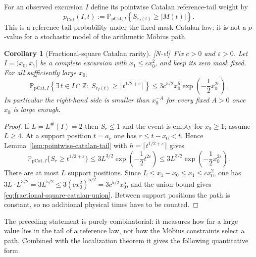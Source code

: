 \documentclass[11pt,reqno]{amsart}
\numberwithin{equation}{section}
\theoremstyle{plain}
\newtheorem{corollary}[theorem]{Corollary}
\theoremstyle{definition}
\theoremstyle{remark}
\newcommand{\eps}{\varepsilon}
\newcommand{\tagNE}{\textup{[N-el]}}
\begin{document}
For an observed excursion $I$ define its pointwise Catalan reference-tail weight
by
\begin{equation}
\label{eq:pointwise-catalan-pvalue}
 p_{\mathrm{Cat}}(I,t):=
 \mathbb P_{\mathrm{pCat},I}
 \left\{S_{r_I(t)}\ge |M(t)|\right\}.
\end{equation}
This is a reference-tail probability under the fixed-mask Catalan law; it is
not a $p$-value for a stochastic model of the arithmetic M\"obius path.

\begin{corollary}[Fractional-square Catalan rarity]
\label{cor:fractional-square-catalan-rarity}
\tagNE\ Fix $c>0$ and $\eps>0$.  Let $I=(x_0,x_1]$ be a complete excursion with
$x_1\le cx_0^2$, and keep its zero mask fixed.  For all sufficiently large
$x_0$,
\begin{equation}
\label{eq:fractional-square-catalan-union}
 \mathbb P_{\mathrm{pCat},I}
 \left\{\exists\,t\in I\cap\mathbb Z:\ S_{r_I(t)}\ge \lceil t^{1/2+\eps}\rceil\right\}
 \le 3c^{5/2}x_0^5
 \exp\!\left(-\frac12x_0^{2\eps}\right).
\end{equation}
In particular the right-hand side is smaller than $x_0^{-A}$ for every
fixed $A>0$ once $x_0$ is large enough.
\end{corollary}

\begin{proof}
If $L=L^\#(I)=2$ then $S_r\le1$ and the event is empty for $x_0\ge1$; assume
$L\ge4$. At a support position $t=a_r$ one has $r\le t-x_0<t$.  Hence
Lemma~\ref{lem:pointwise-catalan-tail} with $h=\lceil t^{1/2+\eps}\rceil$ gives
\begin{equation}
 \mathbb P_{\mathrm{pCat},I}\{S_r\ge t^{1/2+\eps}\}
 \le3L^{3/2}\exp\!\left(-\frac12t^{2\eps}\right)
 \le3L^{3/2}\exp\!\left(-\frac12x_0^{2\eps}\right).
\end{equation}
There are at most $L$ support positions.  Since
$L\le x_1-x_0\le x_1\le cx_0^2$, one has
$3L\cdot L^{3/2}=3L^{5/2}\le3(cx_0^2)^{5/2}=3c^{5/2}x_0^5$, and the union
bound gives
\eqref{eq:fractional-square-catalan-union}.  Between support positions the
path is constant, so no additional physical times have to be counted.
\end{proof}

The preceding statement is purely combinatorial: it measures how far a large
value lies in the tail of a reference law, not how the M\"obius constraints
select a path. Combined with the localization theorem it gives the following
quantitative form.
\end{document}
